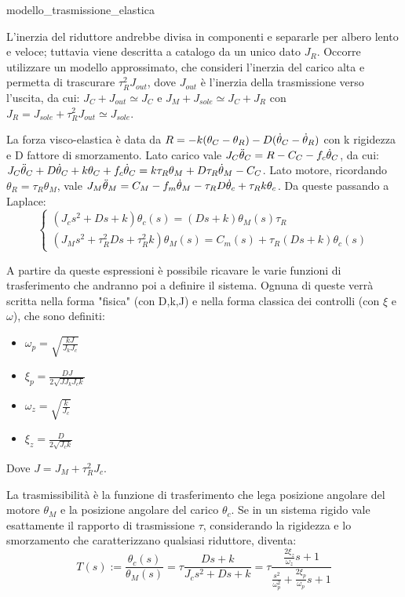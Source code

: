 
{modello_trasmissione_elastica}

L'inerzia del riduttore andrebbe divisa in componenti e separarle per albero lento e veloce; tuttavia viene descritta a catalogo da un unico dato \(J_R\).
Occorre utilizzare un modello approssimato, che consideri l'inerzia del carico alta e permetta di trascurare \(\tau^2_R J_{out}\), dove \(J_{out}\) è l'inerzia della trasmissione verso l'uscita, da cui: \(J_C + J_{out} \simeq J_C\) e \(J_M + J_{sole} \simeq J_C + J_R\) con \(J_R = J_{sole} + \tau^2_R J_{out} \simeq J_{sole}\).

La forza visco-elastica è data da \(R = -k(\theta_C - \theta_R) - D(\dot{\theta}_C - \dot{\theta}_R) \) con k rigidezza e D fattore di smorzamento.
Lato carico vale \(J_C \Ddot{\theta}_C = R - C_C - f_c \dot{\theta}_C\), da cui: \(J_C \Ddot{\theta}_C + D\dot{\theta}_C + k\theta_C + f_c \dot{\theta}_C = k \tau_R \theta_M + D \tau_R \dot{\theta}_M - C_C\).
Lato motore, ricordando \(\theta_R = \tau_R \theta_M\), vale \(J_M \Ddot{\theta}_M = C_M - f_m \dot{\theta}_M - \tau_R D \dot{\theta}_c + \tau_R k \theta_c\).
Da queste passando a Laplace:
\[
\begin{cases}
    (J_c s^2 + D s + k) \theta_c(s) = (D s + k)\theta_M(s) \tau_R \\
    (J_M s^2 + \tau_R^2 D s + \tau_R^2 k)\theta_M(s) = C_m(s) + \tau_R (D s + k)\theta_c(s)
\end{cases}
\]

A partire da queste espressioni è possibile ricavare le varie funzioni di trasferimento che andranno poi a definire il sistema. Ognuna di queste verrà scritta nella forma "fisica" (con D,k,J) e nella forma classica dei controlli (con \(\xi\) e \(\omega\)), che sono definiti:
\begin{itemize}
    \item \(\omega_p = \sqrt{\frac{k J}{J_k J_c}}\)
    \item \(\xi_p = \frac{D J}{2 \sqrt{J J_k J_c k}}\)
    \item \(\omega_z = \sqrt{\frac{k}{J_c}}\)
    \item \(\xi_z = \frac{D}{2\sqrt{J_c k}}\)
\end{itemize}
Dove \(J = J_M + \tau_R^2 J_c\).

La trasmissibilità è la funzione di trasferimento che lega posizione angolare del motore \(\theta_M\) e la posizione angolare del carico \(\theta_c\). Se in un sistema rigido vale esattamente il rapporto di trasmissione \(\tau\), considerando la rigidezza e lo smorzamento che caratterizzano qualsiasi riduttore, diventa:
\[ T(s) := \frac{\theta_c(s)}{\theta_M(s)}=\tau \frac{D s + k}{J_c s^2 + D s +k} = \tau \frac{\frac{2\xi_z}{\omega_z} s + 1}{\frac{s^2}{\omega_p^2} + \frac{2\xi_p}{\omega_p} s + 1}\]

